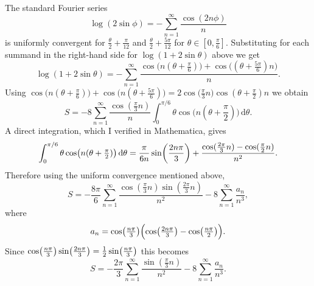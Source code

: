 The standard Fourier series
$$
\log(2\sin \phi) =-\sum_{n=1}^\infty \frac{\cos(2n\phi )}{n}
$$ 
is uniformly convergent for $\frac{\theta}{2} + \frac{\pi}{12}$
and  $\frac{\theta}{2} + \frac{5\pi}{12}$ for $\theta \in [0, \frac{\pi}{6}]$.
Substituting for each summand in the right-hand side for $\log (1 + 2 \sin \theta)$ above we get
$$
\log(1+2\sin\theta)
=
-\sum_{n=1}^\infty
\frac{\cos\bigl(n(\theta+\frac{\pi}{6})\bigr)+\cos\bigl((\theta+\frac{5\pi}{6})n\bigr)}{n}.
$$
Using
$
\cos\bigl( n (\theta+\frac{\pi}{6}) \bigr) + \cos\bigl(n(\theta+\frac{5\pi}{6})\bigr)
= 2\cos\bigl(\frac{\pi}{3}n\bigr)\cos (\theta+\frac{\pi}{2})n
$
we obtain
$$
S
=
-8\sum_{n=1}^\infty \frac{\cos(\frac{\pi}{3}n)}{n}
\int_0^{\pi/6}\theta\cos \bigl( n (\theta+\frac{\pi}{2}) \bigr) \,\mathrm{d}\theta.
$$
A direct integration, which I verified in Mathematica, gives
$$
\int_0^{\pi/6}\theta\cos\bigl (n (\theta+{\textstyle\frac{\pi}{2}}) \bigr) \,\mathrm{d}\theta
=
\frac{\pi}{6n}\sin\!\left(\frac{2n\pi}{3}\right)
+
\frac{\cos(\frac{2\pi}{3} n)-\cos( \frac{\pi}{2}n ) }{n^2}.
$$
Therefore using the uniform convergence mentioned above,
$$
S = -\frac{8\pi}{6}\sum_{n=1}^\infty \frac{\cos(\frac{\pi}{3}n)\sin(\frac{2\pi}{3} n)}{n^2} -8\sum_{n=1}^\infty \frac{a_n}{n^3},
$$
where
$$ a_n =  \cos \bigl( {\textstyle\frac{n\pi}{3}} \bigr) \Bigl( 
\cos\bigl({\textstyle\frac{2n\pi}{3}}\bigr)-\cos\bigl({\textstyle\frac{n\pi}{2}}\bigr) \Bigr). $$
Since
$ \cos\bigl({\textstyle\frac{n\pi}{3}}\bigr)\sin \bigl({\textstyle\frac{2n\pi}{3}}\bigr)
= \frac{1}{2}\sin\bigl( {\textstyle\frac{n\pi}{3}}\bigr) $
this becomes
$$ S =
-\frac{2\pi}{3}\sum_{n=1}^\infty \frac{\sin( \frac{\pi}{3} n)}{n^2}
-8\sum_{n=1}^\infty \frac{a_n}{n^3}.
$$

